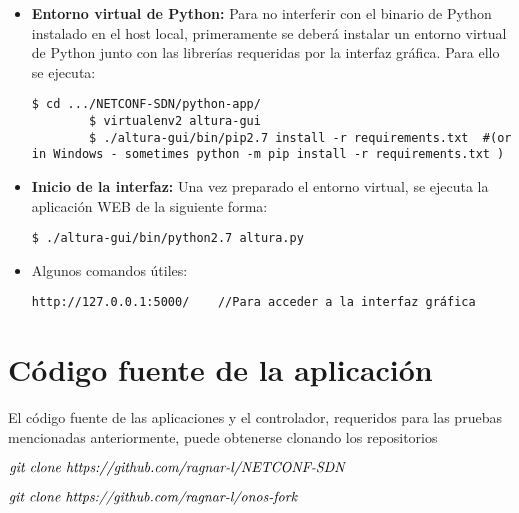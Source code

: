\begin{itemize}   
    \item \textbf{Entorno virtual de Python:} Para no interferir con el binario de Python instalado en el host local, primeramente se deberá instalar un entorno virtual de Python junto con las librerías requeridas por la interfaz gráfica. Para ello se ejecuta: 
	
	\begin{lstlisting}[language=SHELXL]
		$ cd .../NETCONF-SDN/python-app/
		$ virtualenv2 altura-gui
		$ ./altura-gui/bin/pip2.7 install -r requirements.txt  #(or in Windows - sometimes python -m pip install -r requirements.txt )
	\end{lstlisting}
	
	\item \textbf{Inicio de la interfaz:} Una vez preparado el entorno virtual, se ejecuta la aplicación WEB de la siguiente forma: 
	
	\begin{lstlisting}[language=SHELXL]
		$ ./altura-gui/bin/python2.7 altura.py
	\end{lstlisting}

	\item Algunos comandos útiles:
	\begin{lstlisting}[language=SHELXL]
		http://127.0.0.1:5000/    //Para acceder a la interfaz gráfica
	\end{lstlisting}
	
\end{itemize}


\section{Código fuente de la aplicación}
El código fuente de las aplicaciones y el controlador, requeridos para las pruebas mencionadas anteriormente, puede obtenerse clonando los repositorios
\begin{center}
    $ \emph {git clone https://github.com/ragnar-l/NETCONF-SDN}$
\end{center}

\begin{center}
    $ \emph {git clone https://github.com/ragnar-l/onos-fork}$
\end{center}
